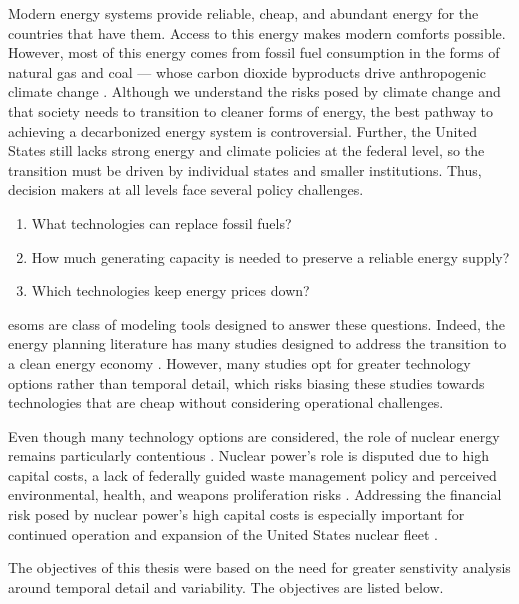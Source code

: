 Modern energy systems provide reliable, cheap, and abundant energy for the
countries that have them. Access to this energy makes modern comforts possible. However,
most of this energy comes from fossil fuel consumption in the forms of natural gas
and coal --- whose carbon dioxide byproducts drive anthropogenic climate change
\cite{eia_frequently_2022}. Although we understand the risks posed by climate
change and that society needs to transition to cleaner forms of energy, the best
pathway to achieving a decarbonized energy system is controversial. Further, the
United States still lacks strong energy and climate policies at the federal level,
so the transition must be driven by individual states and smaller institutions.
Thus, decision makers at all levels face several policy challenges.
\begin{enumerate}
  \item What technologies can replace fossil fuels?
  \item How much generating capacity is needed to preserve a reliable energy supply?
  \item Which technologies keep energy prices down?
\end{enumerate}

\glspl{esom} are class of modeling tools designed to answer these questions. Indeed,
the energy planning literature has many studies designed to address the transition
to a clean energy economy \cite{fattahi_systemic_2020,yue_review_2018,aryanpur_review_2021}.
However, many studies opt for greater technology options rather than temporal detail,
which risks biasing these studies towards technologies that are cheap without
considering operational challenges.

Even though many technology options are considered, the role of nuclear energy
remains particularly contentious \cite{lehtveer_how_2015,clemmer_nuclear_2018,
petti_future_2018}.
Nuclear power's role is disputed due to high capital costs, a lack of federally
guided waste management policy and perceived environmental, health, and weapons
proliferation risks \cite{clemmer_nuclear_2018,petti_future_2018}. Addressing
the financial risk posed by nuclear power's high capital costs is especially
important for continued operation and expansion of the United States nuclear fleet
\cite{petti_future_2018, lehtveer_how_2015}.

The objectives of this thesis were based on the need for greater senstivity
analysis around temporal detail and variability. The objectives are listed below.

